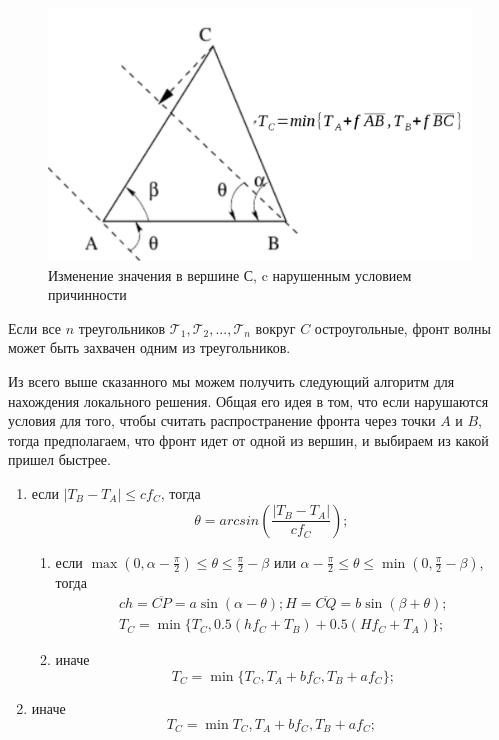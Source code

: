 \begin{figure}[H]
  \centering
  \includegraphics[width=0.7\linewidth]{img/triangle-front.png}
  \hfil \caption{Изменение значения в вершине С, c нарушенным условием
  причинности}
  \label{fig:triangle-front}

\end{figure}

Если все $n$ треугольников
$\mathcal{T}_1,\mathcal{T}_2,...,\mathcal{T}_n$ вокруг $C$
остроугольные, фронт волны может быть захвачен одним из
треугольников.

Из всего выше сказанного мы можем получить следующий алгоритм для
нахождения локального решения. Общая его идея в том, что если 
нарушаются условия для того, чтобы считать распространение фронта
через точки $A$ и $B$, тогда предполагаем, что фронт идет от одной из
вершин, и выбираем из какой пришел быстрее.

\begin{enumerate}
\item если $|T_B-T_A| \le c f_C$, тогда
  \begin{equation*}
    \theta = arcsin \left(\frac{|T_B-T_A|}{c f_C}\right);
  \end{equation*}
  \begin{enumerate}
  \item если $\max (0,\alpha - \frac{\pi}{2}) \le \theta \le
    \frac{\pi}{2} - \beta$ или $\alpha - \frac{\pi}{2} \le \theta \le
    \min(0, \frac{\pi}{2} - \beta)$, тогда
    \begin{equation*}
      \begin{aligned}{c}
        h = \overline{CP} = a \sin(\alpha - \theta); H = \overline{CQ}=
        b \sin (\beta + \theta);\\
        T_C = \min\{T_C,0.5(h f_C + T_B)+0.5(H f_C + T_A)\};
      \end{aligned}
    \end{equation*}
  \item иначе
    \begin{equation*}
      T_C = \min\{T_C,T_A+b f_C, T_B + a f_C\};
    \end{equation*}
  \end{enumerate}
\item иначе
  \begin{equation*}
    T_C = \min{T_C,T_A+b f_C, T_B + a f_C};
  \end{equation*}

\end{enumerate}

